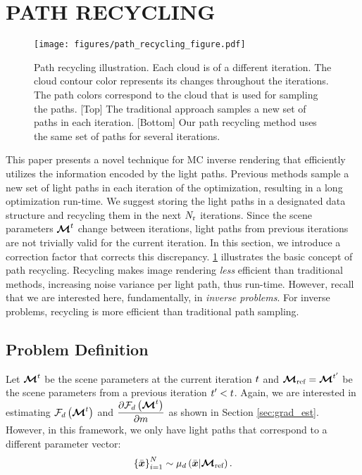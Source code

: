 \documentclass{article}
\begin{document}
\section{PATH RECYCLING}
\begin{figure}[t]
  \centering
  \texttt{[image: figures/path\_recycling\_figure.pdf]} 
    \caption{Path recycling illustration.  Each cloud is of a different iteration. The cloud contour color represents its changes throughout the iterations. The path colors correspond to the cloud that is used for sampling the paths. [Top] The traditional approach samples a new set of paths in each iteration. [Bottom] Our path recycling method uses the same set of paths for several iterations.}
    \label{fig:path_recycling_figure}
\end{figure}    

\label{sec:recycling}
This paper presents a novel technique for \ac{MC} inverse rendering that efficiently utilizes the information encoded by the light paths. Previous methods sample a new set of light paths in each iteration of the optimization, resulting in a long optimization run-time. We suggest storing the light paths in a designated data structure and recycling them in the next $N_{\text{r}}$ iterations. Since the scene parameters $\boldsymbol{\mathcal{M}}^{t}$ change between iterations, light paths from previous iterations are not trivially valid for the current iteration. In this section, we introduce a correction factor that corrects this discrepancy. \fig\ref{fig:path_recycling_figure} illustrates the basic concept of path recycling. Recycling makes image rendering {\em less} efficient than traditional methods, increasing noise variance per light path, thus run-time. However, recall that we are interested here, fundamentally, in {\em inverse problems}. For inverse problems, recycling is more efficient than traditional path sampling.
\subsection{Problem Definition}
Let $\boldsymbol{\mathcal{M}}^{t}$ be the scene parameters at the current iteration $t$ and $\boldsymbol{\mathcal{M}}_{\text{ref}}=\boldsymbol{\mathcal{M}}^{t'}$ be the scene parameters from a previous iteration $t'<t$.
Again, we are interested in estimating $\mathcal{F}_{d}\left({\boldsymbol{\mathcal{M}}^{t}}\right)$ and $\dfrac{\partial {\mathcal{F}_{d}\left({\boldsymbol{\mathcal{M}}^{t}}\right)}}{\partial {m}}$ as shown in Section \ref{sec:grad_est}. However, in this framework, we only have light paths that correspond to a different parameter vector:
$$\left\{ {\Bar{\boldsymbol{x}}}\right\}^{N}_{i=1}\sim \mu_{d}\left({\Bar{\boldsymbol{x}}|\boldsymbol{\mathcal{M}}_{\text{ref}}}\right).$$
\end{document}
